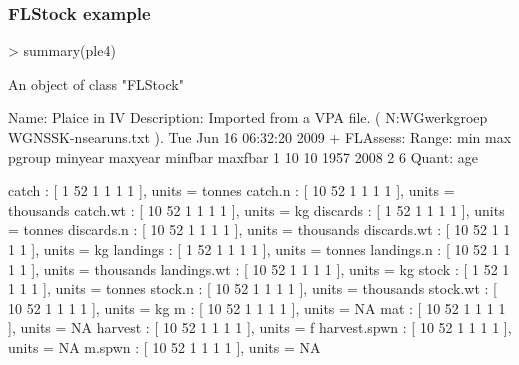 \documentclass{beamer}%
\begin{document}
\begin{frame}[containsverbatim]
  \frametitle{FLStock example}
{\tiny{
\begin{Schunk}
\begin{Sinput}
> summary(ple4)
\end{Sinput}
\begin{Soutput}
An object of class "FLStock"

Name: Plaice in IV 
Description: Imported from a VPA file. ( N:\Projecten\ICES WG\Demersale werkgroep WGNSSK\stock\ple-nsea\final runs\index.txt ).  Tue Jun 16 06:32:20 2009 + FLAssess:  
Range:	 min	max	pgroup	minyear	maxyear	minfbar	maxfbar 
	1	10	10	1957	2008	2	6	
Quant: age 

catch         : [ 1 52 1 1 1 1 ], units =  tonnes 
catch.n       : [ 10 52 1 1 1 1 ], units =  thousands 
catch.wt      : [ 10 52 1 1 1 1 ], units =  kg 
discards      : [ 1 52 1 1 1 1 ], units =  tonnes 
discards.n    : [ 10 52 1 1 1 1 ], units =  thousands 
discards.wt   : [ 10 52 1 1 1 1 ], units =  kg 
landings      : [ 1 52 1 1 1 1 ], units =  tonnes 
landings.n    : [ 10 52 1 1 1 1 ], units =  thousands 
landings.wt   : [ 10 52 1 1 1 1 ], units =  kg 
stock         : [ 1 52 1 1 1 1 ], units =  tonnes 
stock.n       : [ 10 52 1 1 1 1 ], units =  thousands 
stock.wt      : [ 10 52 1 1 1 1 ], units =  kg 
m             : [ 10 52 1 1 1 1 ], units =  NA 
mat           : [ 10 52 1 1 1 1 ], units =  NA 
harvest       : [ 10 52 1 1 1 1 ], units =  f 
harvest.spwn  : [ 10 52 1 1 1 1 ], units =  NA 
m.spwn        : [ 10 52 1 1 1 1 ], units =  NA 
\end{Soutput}
\end{Schunk}
}}
\end{frame}
\end{document}
